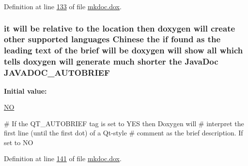 Definition at line \hyperlink{mkdoc_8dox_source_l00133}{133} of file \hyperlink{mkdoc_8dox_source}{mkdoc.\-dox}.

\hypertarget{mkdoc_8dox_aabdcd7fd8cfe4a4c6f9ad5b932398ab2}{
\subsubsection[{J\-A\-V\-A\-D\-O\-C\-\_\-\-A\-U\-T\-O\-B\-R\-I\-E\-F}]{\setlength{\rightskip}{0pt plus 5cm}it will be relative to the location then doxygen will create other supported languages {\bf Chinese} the if found as the leading text of the brief will be doxygen will show all which tells doxygen will generate much shorter the Java\-Doc J\-A\-V\-A\-D\-O\-C\-\_\-\-A\-U\-T\-O\-B\-R\-I\-E\-F}}\label{mkdoc_8dox_aabdcd7fd8cfe4a4c6f9ad5b932398ab2}
{\bfseries Initial value\-:}
\begin{DoxyCode}
 \hyperlink{mkdoc_8dox_a0f6a46245280dc38baf9600906aa1393}{NO}

\textcolor{preprocessor}{# If the QT\_AUTOBRIEF tag is set to YES then Doxygen will }
\textcolor{preprocessor}{}\textcolor{preprocessor}{# interpret the first line (until the first dot) of a Qt-style }
\textcolor{preprocessor}{# comment as the brief description. If set to NO}
\end{DoxyCode}


Definition at line \hyperlink{mkdoc_8dox_source_l00141}{141} of file \hyperlink{mkdoc_8dox_source}{mkdoc.\-dox}.

